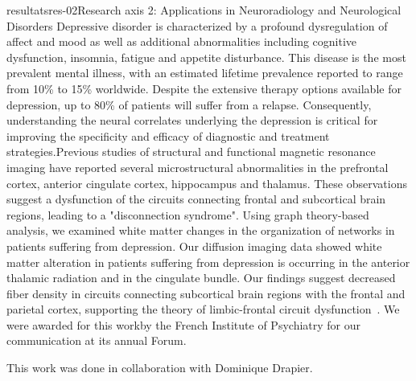 \documentclass{ra2018}
\begin{document}
\begin{module}{resultats}{res-02}{Research axis 2: Applications in Neuroradiology and Neurological Disorders}
Depressive disorder is characterized by a profound dysregulation of affect and mood as well as additional abnormalities including cognitive dysfunction, insomnia, fatigue and appetite disturbance. This disease is the most prevalent mental illness, with an estimated lifetime prevalence reported to range from 10\% to 15\% worldwide. Despite the extensive therapy options available for depression, up to 80\% of patients will suffer from a relapse. Consequently, understanding the neural correlates underlying the depression is critical for improving the specificity and efficacy of diagnostic and treatment strategies.Previous studies of structural and functional magnetic resonance imaging have reported several microstructural abnormalities in the prefrontal cortex, anterior cingulate cortex, hippocampus and thalamus. These observations suggest a dysfunction of the circuits connecting frontal and subcortical brain regions, leading to a "disconnection syndrome". Using graph theory-based analysis, we examined white matter changes in the organization of networks in patients suffering from depression. Our diffusion imaging data showed white matter alteration in patients suffering from depression is occurring in the anterior thalamic radiation and in the cingulate bundle. Our findings suggest decreased fiber density in circuits connecting subcortical brain regions with the frontal and parietal cortex, supporting the theory of limbic-frontal circuit dysfunction~\cite{coloigner:hal-01890087}. We were awarded for this workby the French Institute of Psychiatry for our communication at its annual Forum.

This work was done in collaboration with Dominique Drapier.

\end{module}
\end{document}
